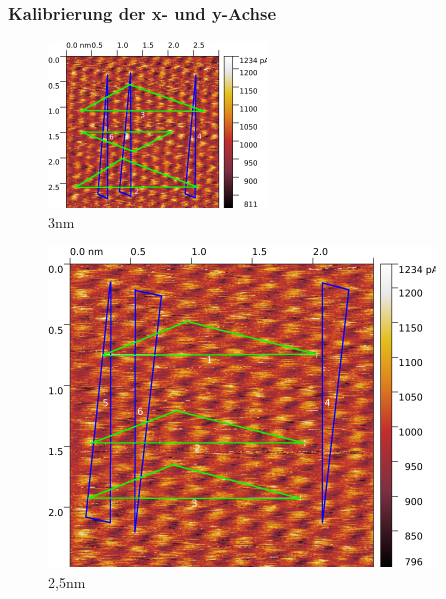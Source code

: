 \subsubsection{Kalibrierung der x- und y-Achse}

\begin{figure}[H]
\centering
\includegraphics[width=\textwidth]{../Gwyddion/HOPG/3nm_gimped.pdf}
\caption{3nm}
\label{3nm}
\end{figure}

\begin{figure}[H]
\centering
\includegraphics[width=\textwidth]{../Gwyddion/HOPG/2,5nm_gimped.pdf}
\caption{2,5nm}
\label{2,5nm}
\end{figure}

